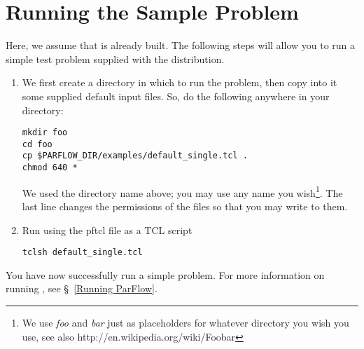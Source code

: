 

\section{Running the Sample Problem}
\label{Running the Sample Problem}

Here, we assume that \parflow{} is already built.  The following steps
 will allow you to run a simple test problem supplied with the
 distribution.
\begin{enumerate}

\item
We first create a directory in which to run the problem,
then copy into it some supplied default input files.
So, do the following anywhere in your  directory:
\begin{display}\begin{verbatim}
mkdir foo
cd foo
cp $PARFLOW_DIR/examples/default_single.tcl .
chmod 640 *
\end{verbatim}\end{display}
We used the directory name  above;
you may use any name you wish\footnote{We use \emph{foo} and \emph{bar} 
just as placeholders for whatever directory you wish you use, 
see also http://en.wikipedia.org/wiki/Foobar}.
The last line changes the permissions of the files so that
you may write to them.

\item
Run \parflow{} using the pftcl file as a TCL script
\begin{display}\begin{verbatim}
tclsh default_single.tcl
\end{verbatim}\end{display}

\end{enumerate}
You have now successfully run a simple \parflow{} problem.
For more information on running \parflow{},
see \S~\ref{Running ParFlow}.

